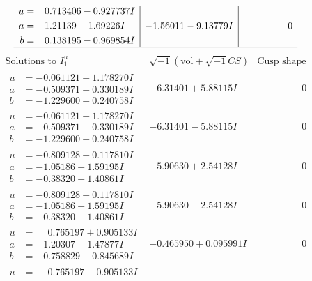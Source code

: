 \documentclass[1p]{elsarticle_modified}
\theoremstyle{definition}
\newcommand{\I}{\sqrt{-1}}
\begin{document}
$$\begin{array}{c|c|c}
\begin{aligned}
u &= \phantom{-}0.713406 - 0.927737 I \\
a &= \phantom{-}1.21139 - 1.69226 I \\
b &= \phantom{-}0.138195 - 0.969854 I\end{aligned}
 & -1.56011 - 9.13779 I & \phantom{-0.000000 } 0\\
 \hline 
 \end{array}$$\newpage$$\begin{array}{c|c|c}  
\text{Solutions to }I^u_{1}& \I (\text{vol} + \sqrt{-1}CS) & \text{Cusp shape}\\
 \hline 
\begin{aligned}
u &= -0.061121 + 1.178270 I \\
a &= -0.509371 - 0.330189 I \\
b &= -1.229600 - 0.240758 I\end{aligned}
 & -6.31401 + 5.88115 I & \phantom{-0.000000 } 0 \\ \hline\begin{aligned}
u &= -0.061121 - 1.178270 I \\
a &= -0.509371 + 0.330189 I \\
b &= -1.229600 + 0.240758 I\end{aligned}
 & -6.31401 - 5.88115 I & \phantom{-0.000000 } 0 \\ \hline\begin{aligned}
u &= -0.809128 + 0.117810 I \\
a &= -1.05186 + 1.59195 I \\
b &= -0.38320 + 1.40861 I\end{aligned}
 & -5.90630 + 2.54128 I & \phantom{-0.000000 } 0 \\ \hline\begin{aligned}
u &= -0.809128 - 0.117810 I \\
a &= -1.05186 - 1.59195 I \\
b &= -0.38320 - 1.40861 I\end{aligned}
 & -5.90630 - 2.54128 I & \phantom{-0.000000 } 0 \\ \hline\begin{aligned}
u &= \phantom{-}0.765197 + 0.905133 I \\
a &= -1.20307 + 1.47877 I \\
b &= -0.758829 + 0.845689 I\end{aligned}
 & -0.465950 + 0.095991 I & \phantom{-0.000000 } 0 \\ \hline\begin{aligned}
u &= \phantom{-}0.765197 - 0.905133 I \\

\end{aligned}
\end{array}$$
\end{document}

